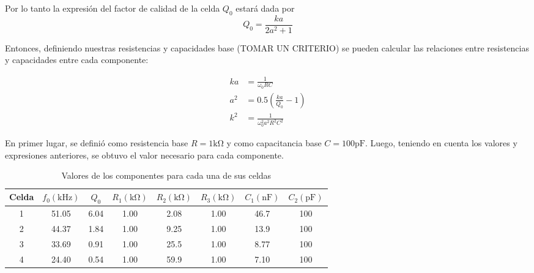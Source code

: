 Por lo tanto la expresión del factor de calidad de la celda $Q_0$ estará dada por
\begin{equation}
    Q_0 = \frac{ka}{2a^2+1}
\end{equation}

Entonces, definiendo nuestras resistencias y capacidades base (TOMAR UN CRITERIO) se pueden calcular las relaciones entre resistencias y capacidades entre cada componente:

\begin{align*}
    ka &= \frac{1}{\omega_0 RC}\\
    a^2&= 0.5\left(\frac{ka}{Q_0}-1\right)\\
    k^2&= \frac{1}{\omega_0^2 a^2 R^2 C^2}
\end{align*}

En primer lugar, se definió como resistencia base $R=1\si{\kilo\ohm}$ y como capacitancia base $C=100\si{\pico\farad}$. Luego, teniendo en cuenta los valores y expresiones anteriores, se obtuvo el valor necesario para cada componente.

\begin{table}[ht]
    \begin{center}
        \begin{tabular}{|c|c|c|c|c|c|c|c|}
            \hline
            Celda   &  $f_0(\si{\kilo\hertz})$   &   $Q_0$   &   $R_1 (\si{\kilo\ohm})$&$R_2(\si{\kilo\ohm})$&$R_3(\si{\kilo\ohm})$&$C_1(\si{\nano\farad})$&$C_2(\si{\pico\farad})$   \\
            \hline
            1   & 51.05 & 6.04  & 1.00  & 2.08  & 1.00  & 46.7  & 100   \\
            2   & 44.37 & 1.84  & 1.00  & 9.25  & 1.00  & 13.9  & 100   \\
            3   & 33.69 & 0.91  & 1.00  & 25.5  & 1.00  & 8.77  & 100   \\
            4   & 24.40 & 0.54  & 1.00  & 59.9  & 1.00  & 7.10  & 100   \\
            \hline
        \end{tabular}
    \end{center}
    \caption{Valores de los componentes para cada una de sus celdas}
\end{table}
